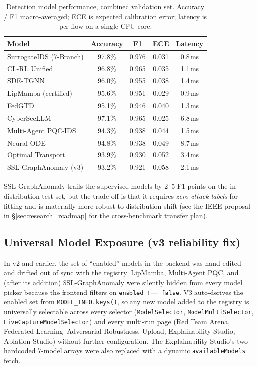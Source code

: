 \documentclass[11pt,a4paper]{article}
\begin{document}
\begin{table}[H]
\centering
\caption{Detection model performance, combined validation set.
  Accuracy / F1 macro-averaged; ECE is expected calibration error;
  latency is per-flow on a single CPU core.}
\label{tab:model_performance_v3}
\small
\begin{tabular}{@{}lcccc@{}}
\toprule
\textbf{Model} & \textbf{Accuracy} & \textbf{F1} & \textbf{ECE} & \textbf{Latency} \\
\midrule
SurrogateIDS (7-Branch)   & 97.8\% & 0.976 & 0.031 & 0.8\,ms \\
CL-RL Unified             & 96.8\% & 0.965 & 0.035 & 1.1\,ms \\
SDE-TGNN                  & 96.0\% & 0.955 & 0.038 & 1.4\,ms \\
LipMamba (certified)      & 95.6\% & 0.951 & 0.029 & 0.9\,ms \\
FedGTD                    & 95.1\% & 0.946 & 0.040 & 1.3\,ms \\
CyberSecLLM               & 97.1\% & 0.965 & 0.025 & 6.8\,ms \\
Multi-Agent PQC-IDS       & 94.3\% & 0.938 & 0.044 & 1.5\,ms \\
Neural ODE                & 94.8\% & 0.938 & 0.049 & 8.7\,ms \\
Optimal Transport         & 93.9\% & 0.930 & 0.052 & 3.4\,ms \\
\rowcolor{newamber!12}
SSL-GraphAnomaly (v3)     & 93.2\% & 0.921 & 0.058 & 2.1\,ms \\
\bottomrule
\end{tabular}
\end{table}

SSL-GraphAnomaly trails the supervised models by 2--5 F1 points on the
in-distribution test set, but the trade-off is that it requires
\emph{zero attack labels} for fitting and is materially more robust
to distribution shift (see the IEEE proposal in
\S\ref{sec:research_roadmap} for the cross-benchmark transfer plan).

\subsection{Universal Model Exposure (v3 reliability fix)}
\label{sec:universal_exposure}

In v2 and earlier, the set of ``enabled'' models in the backend was
hand-edited and drifted out of sync with the registry: LipMamba,
Multi-Agent PQC, and (after its addition) SSL-GraphAnomaly were
silently hidden from every model picker because the frontend filters
on \texttt{enabled !== false}.  V3 auto-derives the enabled set
from \texttt{MODEL\_INFO.keys()}, so any new model added to the
registry is universally selectable across every selector
(\texttt{ModelSelector}, \texttt{ModelMultiSelector},
\texttt{LiveCaptureModelSelector}) and every multi-run page (Red Team
Arena, Federated Learning, Adversarial Robustness, Upload,
Explainability Studio, Ablation Studio) without further configuration.
The Explainability Studio's two hardcoded 7-model arrays were also
replaced with a dynamic \texttt{availableModels} fetch.
\end{document}

